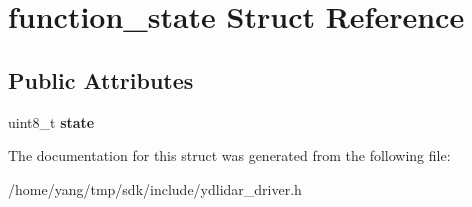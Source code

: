 \hypertarget{structfunction__state}{}\section{function\+\_\+state Struct Reference}
\label{structfunction__state}
\subsection*{Public Attributes}
\begin{DoxyCompactItemize}
\item 
uint8\+\_\+t {\bfseries state}\hypertarget{structfunction__state_a87e57090eb56985ddb9b22fed035209d}{}\label{structfunction__state_a87e57090eb56985ddb9b22fed035209d}

\end{DoxyCompactItemize}


The documentation for this struct was generated from the following file\+:\begin{DoxyCompactItemize}
\item 
/home/yang/tmp/sdk/include/ydlidar\+\_\+driver.\+h\end{DoxyCompactItemize}
